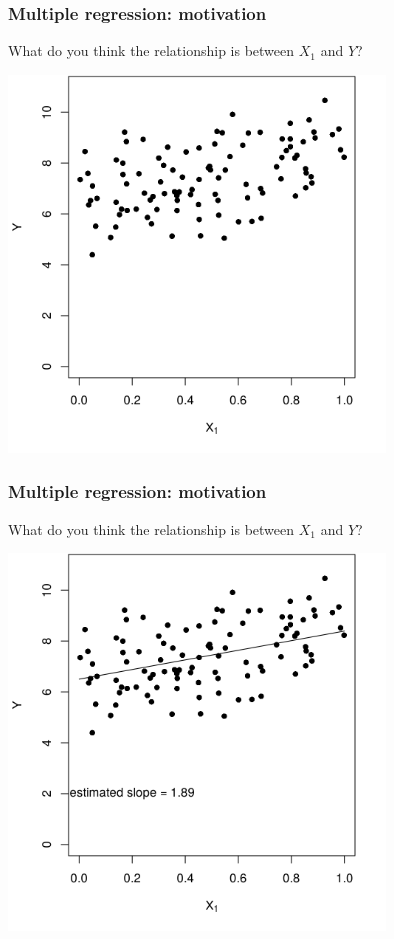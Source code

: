 \documentclass[12pt, 
hyperref={colorlinks=true, linkcolor=blue, urlcolor=cyan},dvipsnames]{beamer}
\begin{document}
\begin{frame}
\frametitle{Multiple regression: motivation}
What do you think the relationship is between $X_1$ and $Y$?

\centering
\includegraphics[width=0.75\textwidth]{plots/precision_simple.png}
\end{frame}

\begin{frame}
\frametitle{Multiple regression: motivation}
What do you think the relationship is between $X_1$ and $Y$?

\centering
\includegraphics[width=0.75\textwidth]{plots/precision_simple_with_line.png}
\end{frame}
\end{document}
